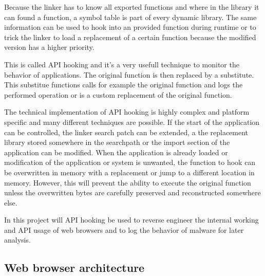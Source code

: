 Because the linker has to know all exported functions and where in the library it can found a function, a symbol table is part of every dynamic library. The same information can be used to hook into an provided function during runtime or to trick the linker to load a replacement of a certain function because the modified version has a higher priority.

This is called API hooking\cite{} and it's a very usefull technique to monitor the behavior of applications. The original function is then replaced by a substitute. This substitue functions calls for example the original function and logs the performed operation or is a custom replacement of the original function.

The technical implementation of API hooking is highly complex and platform specific and many different techniques\cite{http://jbremer.org/x86-api-hooking-demystified/} are possible. If the start of the application can be controlled, the linker search patch can be extended, a the replacement library stored somewhere in the searchpath or the import section of the application can be modified. When the application is already loaded or modification of the application or system is unwanted, the function to hook can be overwritten in memory with a replacement or jump to a different location in memory. However, this will prevent the ability to execute the original function unless the overwritten bytes are carefully preserved and reconstructed somewhere else.

In this project will API hooking be used to reverse engineer the internal working and API usage of web browsers and to log the behavior of malware for later analysis.

\subsection{Web browser architecture}

